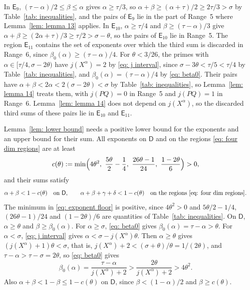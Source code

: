 \documentclass{article}
\numberwithin{equation}{section}
\newcommand{\Le}{\leqslant}
\newcommand{\Ge}{\geqslant}
\begin{document}
In $\mathsf{E}_9$, $(\tau - \alpha)/2 \Le \beta \Le \alpha$ gives $\alpha \Ge \tau/3$, so $\alpha + \beta \Ge (\alpha + \tau)/2 \Ge 2\tau/3 > \sigma$ by Table~\ref{tab: inequalities}, and the pairs of $\mathsf{E}_9$ lie in the part of Range~5 where Lemma~\ref{lem: lemma 13} applies. In $\mathsf{E}_{10}$, $\alpha \Ge \tau/4$ and $\beta \Ge (\tau - \alpha)/3$ give $\alpha + \beta \Ge (2\alpha + \tau)/3 \Ge \tau/2 > \sigma - \theta$, so the pairs of $\mathsf{E}_{10}$ lie in Range~5. The region $\mathsf{E}_{11}$ contains the set of exponents over which the third sum is discarded in Range~6, since $\beta_0(\alpha) \Ge (\tau - \alpha)/4$. For $\theta < 3/26$, the primes with $\alpha \in [\tau/4, \sigma - 2\theta)$ have $j(X^{\alpha}) = 2$ by \eqref{eq: j interval}, since $\sigma - 3\theta < \tau/5 < \tau/4$ by Table~\ref{tab: inequalities}, and $\beta_0(\alpha) = (\tau - \alpha)/4$ by \eqref{eq: beta0}. Their pairs have $\alpha + \beta < 2\alpha < 2(\sigma - 2\theta) < \sigma$ by Table~\ref{tab: inequalities}, so Lemma~\ref{lem: lemma 14} treats them, with $j(PQ) = 0$ in Range~5 and $j(PQ) = 1$ in Range~6. Lemma~\ref{lem: lemma 14} does not depend on $j(X^{\alpha})$, so the discarded third sums of these pairs lie in $\mathsf{E}_{10}$ and $\mathsf{E}_{11}$.

Lemma~\ref{lem: lower bound} needs a positive lower bound for the exponents and an upper bound for their sum. All exponents on $\mathsf{D}$ and on the regions \eqref{eq: four dim regions} are at least
\begin{equation}
\label{eq: exponent floor}
c(\theta) := \min\Bigl( 4\theta^2,\ \frac{5\theta}{2} - \frac{1}{4},\ \frac{26\theta - 1}{24},\ \frac{1 - 2\theta}{6} \Bigr) > 0,
\end{equation}
and their sums satisfy
\begin{equation}
\label{eq: exponent sum}
\alpha + \beta < 1 - c(\theta) \quad \text{on } \mathsf{D}, \qquad \alpha + \beta + \gamma + \delta < 1 - c(\theta) \quad \text{on the regions \eqref{eq: four dim regions}}.
\end{equation}
The minimum in \eqref{eq: exponent floor} is positive, since $4\theta^2 > 0$ and $5\theta/2 - 1/4$, $(26\theta - 1)/24$ and $(1 - 2\theta)/6$ are quantities of Table~\ref{tab: inequalities}. On $\mathsf{D}$, $\alpha \Ge \theta$ and $\beta \Ge \beta_0(\alpha)$. For $\alpha \Ge \sigma$, \eqref{eq: beta0} gives $\beta_0(\alpha) = \tau - \alpha > \theta$. For $\alpha < \sigma$, \eqref{eq: j interval} gives $\alpha < \sigma - j(X^{\alpha})\theta$. Then $\alpha \Ge \theta$ gives $(j(X^{\alpha}) + 1)\theta < \sigma$, that is, $j(X^{\alpha}) + 2 < (\sigma + \theta)/\theta = 1/(2\theta)$, and $\tau - \alpha > \tau - \sigma = 2\theta$, so \eqref{eq: beta0} gives
\begin{equation*}
\beta_0(\alpha) = \frac{\tau - \alpha}{j(X^{\alpha}) + 2} > \frac{2\theta}{j(X^{\alpha}) + 2} > 4\theta^2.
\end{equation*}
Also $\alpha + \beta < 1 - \beta \Le 1 - c(\theta)$ on $\mathsf{D}$, since $\beta < (1 - \alpha)/2$ and $\beta \Ge c(\theta)$.
\end{document}
